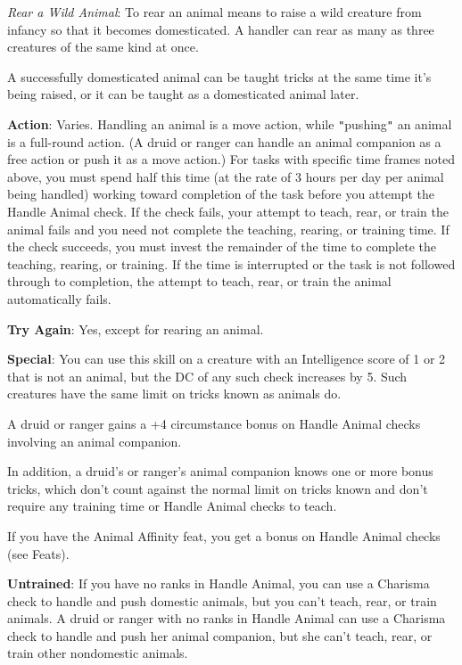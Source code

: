 \textit{Rear a Wild Animal}: To rear an animal means to raise a wild creature from infancy so that it becomes domesticated. A handler can rear as many as three creatures of the same kind at once.
				
A successfully domesticated animal can be taught tricks at the same time it's being raised, or it can be taught as a domesticated animal later.
				
\textbf{Action}: Varies. Handling an animal is a move action, while \texttt{{}"{}}pushing\texttt{{}"{}} an animal is a full-round action. (A druid or ranger can handle an animal companion as a free action or push it as a move action.) For tasks with specific time frames noted above, you must spend half this time (at the rate of 3 hours per day per animal being handled) working toward completion of the task before you attempt the Handle Animal check. If the check fails, your attempt to teach, rear, or train the animal fails and you need not complete the teaching, rearing, or training time. If the check succeeds, you must invest the remainder of the time to complete the teaching, rearing, or training. If the time is interrupted or the task is not followed through to completion, the attempt to teach, rear, or train the animal automatically fails.
				
\textbf{Try Again}: Yes, except for rearing an animal.
				
\textbf{Special}: You can use this skill on a creature with an Intelligence score of 1 or 2 that is not an animal, but the DC of any such check increases by 5. Such creatures have the same limit on tricks known as animals do.
				
A druid or ranger gains a +4 circumstance bonus on Handle Animal checks involving an animal companion.
				
In addition, a druid's or ranger's animal companion knows one or more bonus tricks, which don't count against the normal limit on tricks known and don't require any training time or Handle Animal checks to teach.
				
If you have the Animal Affinity feat, you get a bonus on Handle Animal checks (see Feats).
				
\textbf{Untrained}: If you have no ranks in Handle Animal, you can use a Charisma check to handle and push domestic animals, but you can't teach, rear, or train animals. A druid or ranger with no ranks in Handle Animal can use a Charisma check to handle and push her animal companion, but she can't teach, rear, or train other nondomestic animals.
        	
